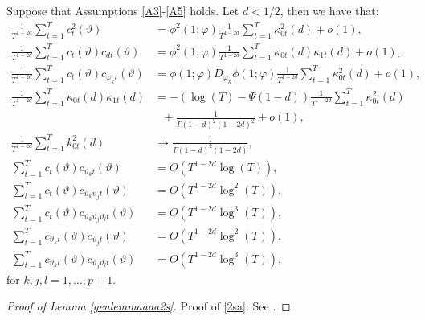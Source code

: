 {{\begin{lemma} \label{genlemmaaaa2s} Suppose that Assumptions \ref{A3}-\ref{A5} holds. Let $d < 1/2$, then we have that:
\begin{align}
      \frac{1}{T^{1-2d} }\sum_{t = 1}^T c^2_{t}(\vartheta) &= \phi^2(1;\varphi)       \frac{1}{T^{1-2d} } \sum_{t = 1}^T \kappa^2_{0t}(d) + o(1), \label{2sa}\\
    \frac{1}{T^{1-2d} }\sum_{t = 1}^T c_{t}(\vartheta) c_{d t}(\vartheta) &= \phi^2(1;\varphi) \frac{1}{T^{1-2d} } \sum_{t = 1}^T \kappa_{0t}(d) \kappa_{1t}(d)   + o(1),  \label{2sb}\\
    \frac{1}{T^{1-2d} }\sum_{t = 1}^T c_{t}(\vartheta) c_{\varphi_{k} t}(\vartheta) &= \phi(1;\varphi) D_{\varphi_{k}}\phi(1;\varphi)  \frac{1}{T^{1-2d}}  \sum_{t = 1}^T \kappa^2_{0t}(d) + o(1), \label{2sc}\\
        \frac{1}{T^{1-2d} } \sum_{t = 1}^T \kappa_{0t}(d) \kappa_{1t}(d)  &=  - \left( \log(T) - \Psi(1-d)\right) \frac{1}{T^{1-2d} }  \sum_{t = 1}^T \kappa^2_{0t}(d) \nonumber \\ 
    &\ \ \ + \frac{1}{\Gamma(1-d)^2 (1-2d)^2}  + o(1),   \label{2sc1}\\
     \frac{1}{T^{1-2d}}\sum_{t = 1}^T k^2_{0t}(d) &\rightarrow \frac{1}{\Gamma(1-d)^2 (1-2d)}, \label{2sc2} \\
     \sum_{t = 1}^T c_{t}(\vartheta) c_{\vartheta_k t}(\vartheta) &= O(T^{1-2d} \log(T)), \label{2sd1} \\
     \sum_{t = 1}^T c_{t}(\vartheta) c_{\vartheta_k \vartheta_j t}(\vartheta) &= O(T^{1-2d} \log^2(T)), \label{2sd2} \\
     \sum_{t = 1}^T c_{t}(\vartheta) c_{\vartheta_k \vartheta_j \vartheta_l t}(\vartheta) &= O(T^{1-2d} \log^3(T)), \label{2sd3} \\
      \sum_{t = 1}^T c_{\vartheta_k t}(\vartheta) c_{\vartheta_j t}(\vartheta) &= O(T^{1-2d} \log^2(T)), \label{2sd4} \\
      \sum_{t = 1}^T c_{\vartheta_k t}(\vartheta) c_{\vartheta_j \vartheta_l  t}(\vartheta) &= O(T^{1-2d} \log^3(T)), \label{2sd5}  
\end{align} 
for $k,j,l = 1,\ldots, p+1$.
\end{lemma}
\begin{proof}[Proof of Lemma \ref{genlemmaaaa2s}]
Proof of \eqref{2sa}: See \textcite[Lemma S.15]{hualde2020truncated}.


\end{proof}}}
